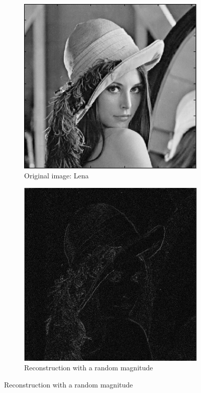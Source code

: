 \documentclass[a4paper, 10pt, conference] {article}
\begin{document}
 \begin{figure}[H]
 	\centering
 	\begin{subfigure}{0.49\textwidth} 
 		\centering						
 		\includegraphics[scale=0.5]{reportImages/exp1_lena.PNG}
 		\caption{Original image: Lena}
 	\end{subfigure}
 	\begin{subfigure}{0.49\textwidth}
 		\centering
 		\includegraphics[scale=0.37]{reportImages/exp1_random_mag.PNG}
 		\caption{Reconstruction with a random magnitude}
 	\end{subfigure}
 	\label{exp1_3}
 \end{figure}
\end{document}

